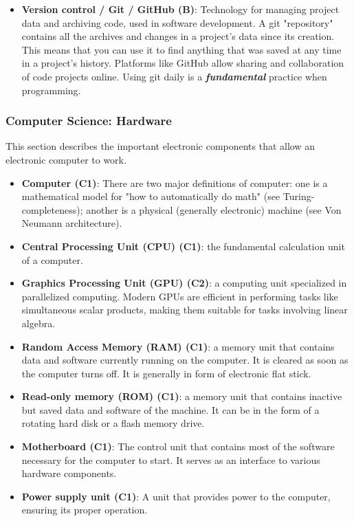 \documentclass{article}
\begin{document}
\begin{itemize}
    \item \textbf{Version control / Git / GitHub (B)}: Technology for managing project data and archiving code, used in software development. A git "repository" contains all the archives and changes in a project's data since its creation. This means that you can use it to find anything that was saved at any time in a project's history. Platforms like GitHub allow sharing and collaboration of code projects online. Using git daily is a \textbf{\textit{fundamental}} practice when programming.
\end{itemize}


\subsubsection*{Computer Science: Hardware}

This section describes the important electronic components that allow an electronic computer to work.

\begin{itemize}
    \item \textbf{Computer (C1)}: There are two major definitions of computer: one is a mathematical model for "how to automatically do math" (see Turing-completeness); another is a physical (generally electronic) machine (see Von Neumann architecture).
    
    \item \textbf{Central Processing Unit (CPU) (C1)}: the fundamental calculation unit of a computer.
    
    \item \textbf{Graphics Processing Unit (GPU) (C2)}: a computing unit specialized in parallelized computing. Modern GPUs are efficient in performing tasks like simultaneous scalar products, making them suitable for tasks involving linear algebra.
    
    \item \textbf{Random Access Memory (RAM) (C1)}: a memory unit that contains data and software currently running on the computer. It is cleared as soon as the computer turns off. It is generally in form of electronic flat stick.
    
    \item \textbf{Read-only memory (ROM) (C1)}: a memory unit that contains inactive but saved data and software of the machine. It can be in the form of a rotating hard disk or a flash memory drive.
    
    \item \textbf{Motherboard (C1)}: The control unit that contains most of the software necessary for the computer to start. It serves as an interface to various hardware components.
    
    \item \textbf{Power supply unit (C1)}: A unit that provides power to the computer, ensuring its proper operation.
\end{itemize}
\end{document}

